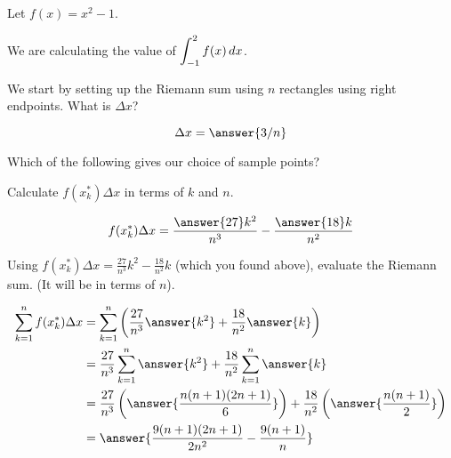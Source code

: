 \documentclass{ximera}
\author{Bobby Ramsey}
\begin{document}
\begin{exercise}
Let $f(x) = x^2-1$. 
		\begin{image}
		\end{image}

We are calculating the value of $\displaystyle \int_{-1}^{2} f(x) \mathop{}\!d x$.



	We start by setting up the Riemann sum using $n$ rectangles using right endpoints.
	What is $\Delta x$?
	
	\[ \Delta x = \answer{3/n} \]

	\begin{exercise}
		Which of the following gives our choice of sample points?
		\begin{multipleChoice}
		\end{multipleChoice}
		
		\begin{exercise}
			Calculate $f(x_k^*) \Delta x$ in terms of $k$ and $n$.
			
			\[ f(x_k^*) \Delta x = \frac{\answer{27}k^2}{n^3}-\frac{\answer{18}k}{n^2} \]
			\begin{exercise}
				Using $f(x_k^*)\Delta x = \frac{27}{n^3}k^2 - \frac{18}{n^2}k$ (which you found above), evaluate the Riemann sum.  (It will be in terms of $n$).
				
				\begin{align*}
					\sum_{k=1}^{n} f(x_k^*)\Delta x &=  \sum_{k=1}^{n} \left(\frac{27}{n^3}\answer{k^2} + \frac{18}{n^2}\answer{k}\right)\\
						&= \frac{27}{n^3} \sum_{k=1}^{n} \answer{k^2} + \frac{18}{n^2} \sum_{k=1}^{n} \answer{k}\\
						&= \frac{27}{n^3} \left( \answer{\frac{n(n+1)(2n+1)}{6}}\right) + \frac{18}{n^2} \left( \answer{\frac{n(n+1)}{2}}\right)\\
						&= \answer{\frac{9(n+1)(2n+1)}{2n^2}-\frac{9(n+1)}{n}}
				\end{align*}
				

\end{exercise}
\end{exercise}
\end{exercise}
\end{exercise}
\end{document}

